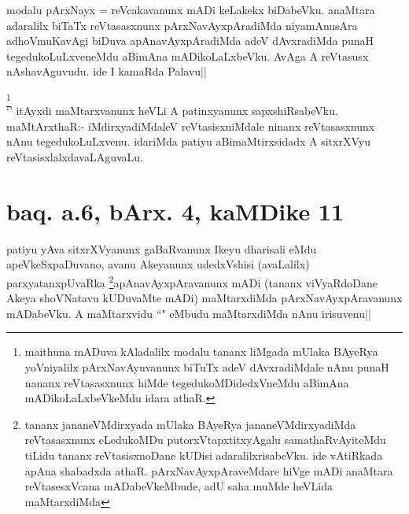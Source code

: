 \begin{artha}
modalu pArxNayx = reVcakavanunx mADi keLakekx biDabeVku. anaMtara 
adaralilx biTaTx reVtasasxnunx pArxNavAyxpAradiMda niyamAnusAra 
adhoVmuKavAgi biDuva apAnavAyxpAradiMda adeV dAvxradiMda punaH 
tegedukoLuLxveneMdu aBimAna mADikoLaLxbeVku. AvAga A reVtasusx 
nAshavAguvudu. ide I kamaRda Palavu||
\end{artha}


\begin{artha}
\footnote[1]{maithuna mADuva kAladalilx modalu tananx liMgada mUlaka 
BAyeRya yoVniyalilx pArxNavAyuvanunx biTuTx adeV dAvxradiMdale nAnu 
punaH nananx reVtasasxnunx hiMde tegedukoMDidedxVneMdu aBimAna 
mADikoLaLxbeVkeMdu idara athaR.}\\
`\stext' itAyxdi maMtarxvanunx heVLi A patinxyanunx sapxshiRsabeVku. 
maMtArxthaR:- iMdirxyadiMdaleV reVtasisxniMdale ninanx reVtasasxnunx 
nAnu tegedukoLuLxvenu. idariMda patiyu aBimaMtirxsidadx A sitxrXVyu 
reVtasisxlalxdavaLAguvaLu.
\end{artha}

\section*{baq. a.6, bArx. 4, kaMDike 11}

\stext


\begin{artha}
patiyu yAva sitxrXVyanunx gaBaRvanunx Ikeyu dharisali eMdu 
apeVkeSxpaDuvano, avanu Akeyanunx udedxVshisi (avaLalilx) 
parxyatanxpUvaRka \footnote[2]{tananx jananeVMdirxyada mUlaka BAyeRya 
jananeVMdirxyadiMda reVtasasxnunx eLedukoMDu putorxVtapxtitxyAgalu 
samathaRvAyiteMdu tiLidu tananx reVtasisxnoDane kUDisi 
adaralilxrisabeVku. ide vAtiRkada apAna shabadxda athaR. 
pArxNavAyxpAraveMdare hiVge mADi anaMtara reVtasesxVcana 
mADabeVkeMbude, adU saha muMde heVLida maMtarxdiMda}apAnavAyxpAravanunx mADi (tananx 
viVyaRdoDane Akeya shoVNatavu kUDuvaMte mADi) maMtarxdiMda 
pArxNavAyxpAravanunx mADabeVku. A maMtarxvidu ``\stext" eMbudu 
maMtarxdiMda nAnu irisuvenu||
\end{artha}


